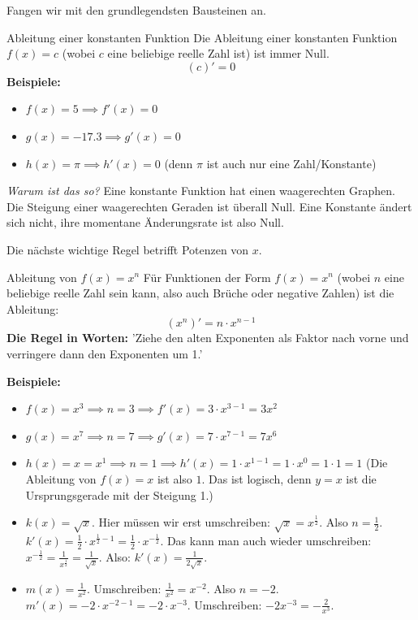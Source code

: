 Fangen wir mit den grundlegendsten Bausteinen an.

\begin{merksatzumgebung}[Konstantenregel]{Ableitung einer konstanten Funktion}
Die Ableitung einer konstanten Funktion $f(x)=c$ (wobei $c$ eine beliebige reelle Zahl ist) ist immer Null.
\[ (c)' = 0 \]
\textbf{Beispiele:}
\begin{itemize}
    \item $f(x) = 5 \implies f'(x) = 0$
    \item $g(x) = -17.3 \implies g'(x) = 0$
    \item $h(x) = \pi \implies h'(x) = 0$ (denn $\pi$ ist auch nur eine Zahl/Konstante)
\end{itemize}
\textit{Warum ist das so?} Eine konstante Funktion hat einen waagerechten Graphen. Die Steigung einer waagerechten Geraden ist überall Null. Eine Konstante ändert sich nicht, ihre momentane Änderungsrate ist also Null.
\end{merksatzumgebung}

Die nächste wichtige Regel betrifft Potenzen von $x$.

\begin{merksatzumgebung}[Potenzregel]{Ableitung von $f(x) = x^n$}
Für Funktionen der Form $f(x) = x^n$ (wobei $n$ eine beliebige reelle Zahl sein kann, also auch Brüche oder negative Zahlen) ist die Ableitung:
\[ (x^n)' = n \cdot x^{n-1} \]
\textbf{Die Regel in Worten:} 'Ziehe den alten Exponenten als Faktor nach vorne und verringere dann den Exponenten um 1.'

\textbf{Beispiele:}
\begin{itemize}
    \item $f(x) = x^3 \implies n=3 \implies f'(x) = 3 \cdot x^{3-1} = 3x^2$
    \item $g(x) = x^7 \implies n=7 \implies g'(x) = 7 \cdot x^{7-1} = 7x^6$
    \item $h(x) = x = x^1 \implies n=1 \implies h'(x) = 1 \cdot x^{1-1} = 1 \cdot x^0 = 1 \cdot 1 = 1$
    (Die Ableitung von $f(x)=x$ ist also $1$. Das ist logisch, denn $y=x$ ist die Ursprungsgerade mit der Steigung 1.)
    \item $k(x) = \sqrt{x}$. Hier müssen wir erst umschreiben: $\sqrt{x} = x^{\frac{1}{2}}$. Also $n=\frac{1}{2}$.
    $k'(x) = \frac{1}{2} \cdot x^{\frac{1}{2}-1} = \frac{1}{2} \cdot x^{-\frac{1}{2}}$.
    Das kann man auch wieder umschreiben: $x^{-\frac{1}{2}} = \frac{1}{x^{\frac{1}{2}}} = \frac{1}{\sqrt{x}}$.
    Also: $k'(x) = \frac{1}{2\sqrt{x}}$.
    \item $m(x) = \frac{1}{x^2}$. Umschreiben: $\frac{1}{x^2} = x^{-2}$. Also $n=-2$.
    $m'(x) = -2 \cdot x^{-2-1} = -2 \cdot x^{-3}$.
    Umschreiben: $-2x^{-3} = -\frac{2}{x^3}$.
\end{itemize}
\end{merksatzumgebung}


